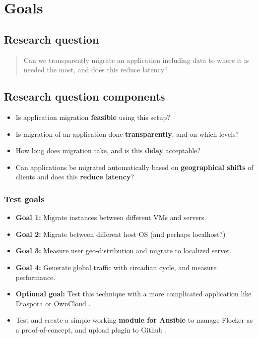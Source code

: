\documentclass{article}
\begin{document}
\pagebreak


\section{Goals}

\subsection{Research question}

\begin{framed}\begin{quote}{\Large Can we transparently migrate an application including data to where it is needed the most, and does this reduce latency?}\end{quote}\end{framed}

\subsection{Research question components}
\begin{itemize}
\item{Is application migration \textbf{feasible} using this setup?}
\item{Is migration of an application done \textbf{transparently}, and on which levels?}
\item{How long does migration take, and is this \textbf{delay} acceptable?}
\item{Can applications be migrated automatically based on \textbf{geographical shifts} of clients and does this \textbf{reduce latency}?}
\end{itemize}


\subsubsection{Test goals}
\begin{itemize}
  \item{\textbf{Goal 1:} Migrate instances between different VMs and servers.}
  \item{\textbf{Goal 2:} Migrate between different host OS (and perhaps localhost?)}
  \item{\textbf{Goal 3:} Measure user geo-distribution and migrate to localized server.}    
  \item{\textbf{Goal 4:} Generate global traffic with circadian cycle, and measure performance.}
  \item{\textbf{Optional goal:} Test this technique with a more complicated application like Diaspora \cite{diasporadocker} or OwnCloud \cite{ownclouddocker}.}
  \item{Test and create a simple working \textbf{module for Ansible} to manage Flocker as a proof-of-concept, and upload plugin to Github \cite{githubos3daffe}.}
\end{itemize}
\end{document}
